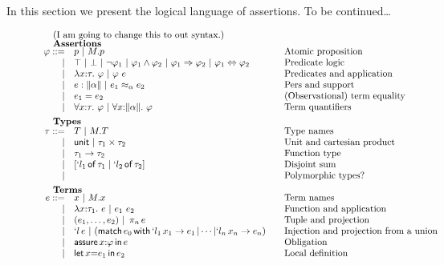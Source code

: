 In this section we present the logical language of assertions. To be
continued\dots

\begin{figure}
	\[
	\begin{array}{rl@{\qquad}l}
          \noalign{(I am going to change this to out syntax.)}
		\noalign{\textbf{Assertions}}
		\ip ::= 
		    & \iP \ibar \iselect{\im}{\iP}&\mbox{Atomic
                      proposition}\\
		  | & \itrue  \ibar \ifalse \ibar \inot{\ip_1} \ibar \iand{\ip_1}{\ip_2} \ibar 
		      \iimply{\ip_1}{\ip_2} \ibar \iiff{\ip_1}{\ip_2} & \mbox{Predicate logic}\\
		  | & \ilambda{\ix}{\ity}{\ip}  \ibar \iapp{\ip}{\ie} & \mbox{Predicates and application}\\
                    | & \ie : \support{\iS}  \ibar \ie_1 \iper{\iS} \ie_2 & \mbox{Pers and support} \\
		  | & \iequal{\ie_1}{\ie_2} & \mbox{(Observational) term equality}\\
		  | & \iforall{\ix}{\ity}{\ip}  \ibar 
		      \iforall{\ix}{\support{\iS}}{\ip} & \mbox{Term quantifiers}\\[5pt]
		
		\noalign{\textbf{Types}}
		\ity ::= 
		    & \iTy  \ibar \iselect{\im}{\iTy} &\mbox{Type names}\\
		  | & \iunit \ibar \ity_1 \times \ity_2 &\mbox{Unit and cartesian product}\\
		  | & \ity_1 \to \ity_2 & \mbox{Function type}\\
		  | & \isumty{\il_1}{\ity_1}{\il_2}{\ity_2} &\mbox{Disjoint sum}\\
                  | & & \mbox{Polymorphic types?}\\[5pt]
		
		\noalign{\textbf{Terms}}	
		\ie ::=
		    & \ix \ibar \iselect{\im}{\ix} &\mbox{Term names}\\
		  | & \ilambda{\ix}{\ity_1}{\ie} \ibar 
		      \iapp{\ie_1}{\ie_2} &\mbox{Function and application}\\
		  | & \ituple{\ie_1}{\ie_2} 
		      \ibar \iproj{\ie}{n}&\mbox{Tuple and projection}\\
		  | & \iinjty{\il}{\ie} 
		      \ibar (\imatchesty{\ie_0}{\il_1}{\ix_1}{\ie_1}{\il_n}{\ix_n}{\ie_n})&\mbox{Injection and projection from a union}\\
		  | & \ioblig{\ix}{\ip}{\ie}&\mbox{Obligation}\\
		  | & \ilet{\ix}{\ie_1}{\ie_2}&\mbox{Local definition}\\[5pt]
		

\end{array}\]
\end{figure}

